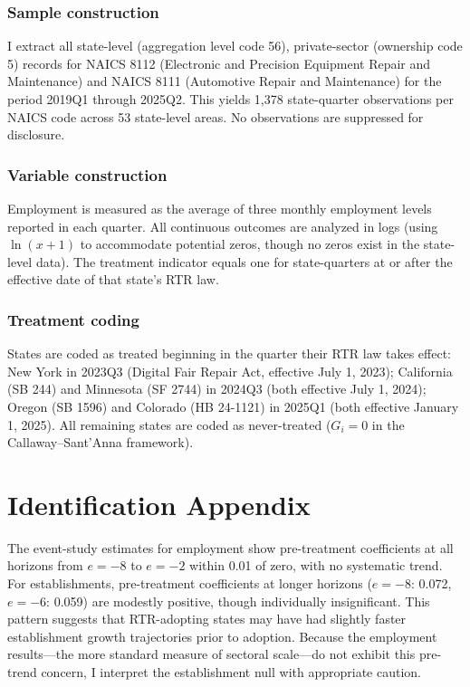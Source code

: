 \documentclass[12pt]{article}
\begin{document}
\subsubsection*{Sample construction} I extract all state-level (aggregation level code 56), private-sector (ownership code 5) records for NAICS 8112 (Electronic and Precision Equipment Repair and Maintenance) and NAICS 8111 (Automotive Repair and Maintenance) for the period 2019Q1 through 2025Q2. This yields 1,378 state-quarter observations per NAICS code across 53 state-level areas. No observations are suppressed for disclosure.

\subsubsection*{Variable construction} Employment is measured as the average of three monthly employment levels reported in each quarter. All continuous outcomes are analyzed in logs (using $\ln(x + 1)$ to accommodate potential zeros, though no zeros exist in the state-level data). The treatment indicator equals one for state-quarters at or after the effective date of that state's RTR law.

\subsubsection*{Treatment coding} States are coded as treated beginning in the quarter their RTR law takes effect: New York in 2023Q3 (Digital Fair Repair Act, effective July 1, 2023); California (SB 244) and Minnesota (SF 2744) in 2024Q3 (both effective July 1, 2024); Oregon (SB 1596) and Colorado (HB 24-1121) in 2025Q1 (both effective January 1, 2025). All remaining states are coded as never-treated ($G_i = 0$ in the Callaway--Sant'Anna framework).

\section{Identification Appendix}

The event-study estimates for employment show pre-treatment coefficients at all horizons from $e = -8$ to $e = -2$ within 0.01 of zero, with no systematic trend. For establishments, pre-treatment coefficients at longer horizons ($e = -8$: 0.072, $e = -6$: 0.059) are modestly positive, though individually insignificant. This pattern suggests that RTR-adopting states may have had slightly faster establishment growth trajectories prior to adoption. Because the employment results---the more standard measure of sectoral scale---do not exhibit this pre-trend concern, I interpret the establishment null with appropriate caution.
\end{document}
